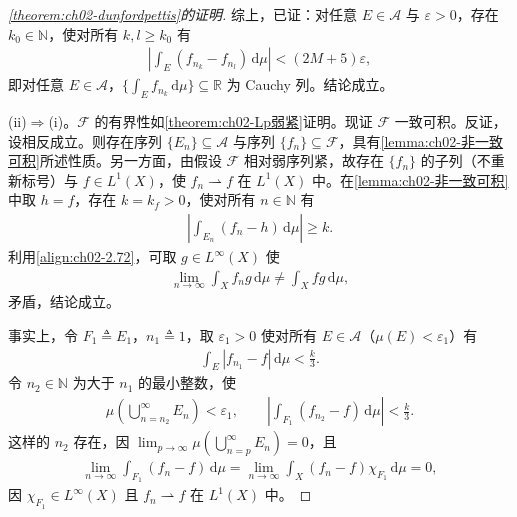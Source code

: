 \documentclass[../../main.tex]{subfiles}%
\begin{document}
\begin{proof}[\cref{theorem:ch02-dunfordpettis}的证明]
综上，已证：对任意 $E\in\mathscr A$ 与 $\varepsilon>0$，存在 $k_0\in\mathbb N$，使对所有 $k,l\geqslant k_0$ 有
\begin{align*}
\left|\int_E(f_{n_k}-f_{n_l})\,\mathrm{d}\mu\right|<(2M+5)\varepsilon,
\end{align*}
即对任意 $E\in\mathscr A$，$\{\int_E f_{n_k}\,\mathrm{d}\mu\}\subseteq\mathbb R$ 为 Cauchy 列。结论成立。

(ii)$\Rightarrow$(i)。$\mathscr F$ 的有界性如\cref{theorem:ch02-Lp弱紧}证明。现证 $\mathscr F$ 一致可积。反证，设相反成立。则存在序列 $\{E_n\}\subseteq\mathscr A$ 与序列 $\{f_n\}\subseteq\mathscr F$，具有\cref{lemma:ch02-非一致可积}所述性质。另一方面，由假设 $\mathscr F$ 相对弱序列紧，故存在 $\{f_n\}$ 的子列（不重新标号）与 $f\in L^1(X)$，使 $f_n\rightharpoonup f$ 在 $L^1(X)$ 中。在\cref{lemma:ch02-非一致可积}中取 $h=f$，存在 $k=k_f>0$，使对所有 $n\in\mathbb N$ 有
\begin{align}
\left|\int_{E_n}(f_n-h)\,\mathrm{d}\mu\right|\geqslant k. \label{align:ch02-2.72}
\end{align}
利用\eqref{align:ch02-2.72}，可取 $g\in L^\infty(X)$ 使
\begin{align}
\lim_{n\to\infty}\int_X f_ng\,\mathrm{d}\mu\neq\int_X fg\,\mathrm{d}\mu, \label{align:ch02-2.73}
\end{align}
矛盾，结论成立。

事实上，令 $F_1\triangleq E_1$，$n_1\triangleq 1$，取 $\varepsilon_1>0$ 使对所有 $E\in\mathscr A$（$\mu(E)<\varepsilon_1$）有
\begin{align*}
\int_E|f_{n_1}-f|\,\mathrm{d}\mu<\frac k3.
\end{align*}
令 $n_2\in\mathbb N$ 为大于 $n_1$ 的最小整数，使
\begin{align*}
\mu\left(\bigcup_{n=n_2}^\infty E_n\right)<\varepsilon_1,\qquad
\left|\int_{F_1}(f_{n_2}-f)\,\mathrm{d}\mu\right|<\frac k3.
\end{align*}
这样的 $n_2$ 存在，因 $\lim_{p\to\infty}\mu(\bigcup_{n=p}^\infty E_n)=0$，且
\begin{align*}
\lim_{n\to\infty}\int_{F_1}(f_n-f)\,\mathrm{d}\mu=\lim_{n\to\infty}\int_X(f_n-f)\chi_{F_1}\,\mathrm{d}\mu=0,
\end{align*}
因 $\chi_{F_1}\in L^\infty(X)$ 且 $f_n\rightharpoonup f$ 在 $L^1(X)$ 中。


\end{proof}
\end{document}
